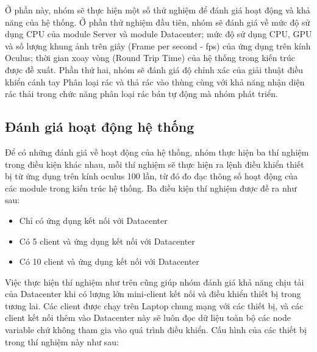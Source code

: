 Ở phần này, nhóm sẽ thực hiện một số thử nghiệm để đánh giá hoạt động và khả năng của hệ thống. Ở phần thử nghiệm đầu tiên, nhóm sẽ đánh giá về mức độ sử dụng CPU của module Server và module Datacenter; mức độ sử dụng CPU, GPU và số lượng khung ảnh trên giây (Frame per second - fps) của ứng dụng trên kính Oculus; thời gian xoay vòng (Round Trip Time) của hệ thống trong kiến trúc được đề xuất. Phần thứ hai, nhóm sẽ đánh giá độ chỉnh xác của giải thuật điều khiển cánh tay Phân loại rác và thả rác vào thùng cùng với khả năng nhận diện rác thải trong chức năng phân loại rác bán tự động mà nhóm phát triển.

\subsection{Đánh giá hoạt động hệ thống}

Để có những đánh giá về hoạt động của hệ thống, nhóm thực hiện ba thí nghiệm trong điều kiện khác nhau, mỗi thí nghiệm sẽ thực hiện ra lệnh điều khiển thiết bị từ ứng dụng trên kính oculus 100 lần, từ đó đo đạc thông số hoạt động của các module trong kiến trúc hệ thống. Ba điều kiện thí nghiệm được đề ra như sau:

\begin{itemize}
    \item Chỉ có ứng dụng kết nối với Datacenter
    \item Có 5 client và ứng dụng kết nối với Datacenter
    \item Có 10 client và ứng dụng kết nối với Datacenter
\end{itemize}

Việc thực hiện thí nghiệm như trên cũng giúp nhóm đánh giá khả năng chịu tải của Datacenter khi có lượng lớn mini-client kết nối và điều khiển thiết bị trong tương lai. Các client được chạy trên Laptop chung mạng với các thiết bị, và các client kết nối thêm vào Datacenter này sẽ luôn đọc dữ liệu toàn bộ các node variable chứ không tham gia vào quá trình điều khiển. Cấu hình của các thiết bị trong thí nghiệm này như sau:

